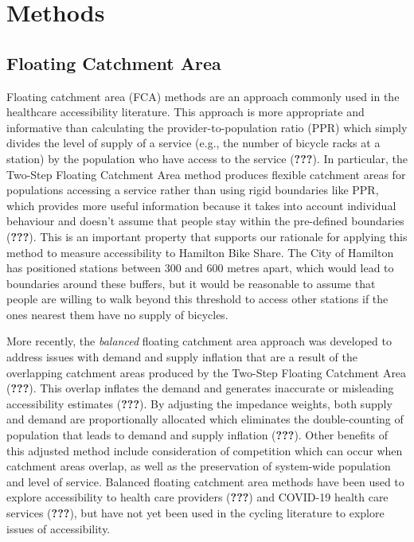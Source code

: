 \documentclass[]{elsarticle} %
\begin{document}
\hypertarget{sec:methods}{%
\section{Methods}\label{sec:methods}}

\hypertarget{floating-catchment-area}{%
\subsection{Floating Catchment Area}\label{floating-catchment-area}}

Floating catchment area (FCA) methods are an approach commonly used in
the healthcare accessibility literature. This approach is more
appropriate and informative than calculating the provider-to-population
ratio (PPR) which simply divides the level of supply of a service (e.g.,
the number of bicycle racks at a station) by the population who have
access to the service ({\textbf{???}}). In particular, the Two-Step
Floating Catchment Area method produces flexible catchment areas for
populations accessing a service rather than using rigid boundaries like
PPR, which provides more useful information because it takes into
account individual behaviour and doesn't assume that people stay within
the pre-defined boundaries ({\textbf{???}}). This is an important
property that supports our rationale for applying this method to measure
accessibility to Hamilton Bike Share. The City of Hamilton has
positioned stations between 300 and 600 metres apart, which would lead
to boundaries around these buffers, but it would be reasonable to assume
that people are willing to walk beyond this threshold to access other
stations if the ones nearest them have no supply of bicycles.

More recently, the \emph{balanced} floating catchment area approach was
developed to address issues with demand and supply inflation that are a
result of the overlapping catchment areas produced by the Two-Step
Floating Catchment Area ({\textbf{???}}). This overlap inflates the
demand and generates inaccurate or misleading accessibility estimates
({\textbf{???}}). By adjusting the impedance weights, both supply and
demand are proportionally allocated which eliminates the double-counting
of population that leads to demand and supply inflation
({\textbf{???}}). Other benefits of this adjusted method include
consideration of competition which can occur when catchment areas
overlap, as well as the preservation of system-wide population and level
of service. Balanced floating catchment area methods have been used to
explore accessibility to health care providers ({\textbf{???}}) and
COVID-19 health care services ({\textbf{???}}), but have not yet been
used in the cycling literature to explore issues of accessibility.
\end{document}
